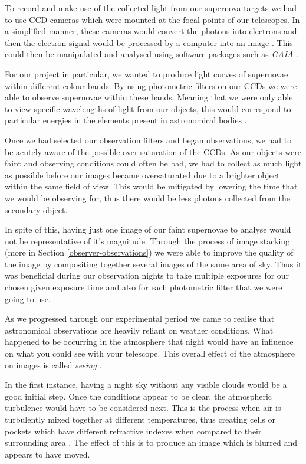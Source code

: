 \documentclass[twocolumn]{revtex4}
\begin{document}
To record and make use of the collected light from our supernova targets we had to use CCD cameras which were mounted at the focal points of our telescopes. In a simplified manner, these cameras would convert the photons into electrons and then the electron signal would be processed by a computer into an image \cite{mod_ast, tel_tech}. This could then be manipulated and analysed using software packages such as \textit{GAIA} \cite{starlink}.

For our project in particular, we wanted to produce light curves of supernovae within different colour bands. By using photometric filters on our CCDs we were able to observe supernovae within these bands. Meaning that we were only able to view specific wavelengths of light from our objects, this would correspond to particular energies in the elements present in astronomical bodies \cite{astro_filters}. 

Once we had selected our observation filters and began observations, we had to be acutely aware of the possible over-saturation of the CCDs. As our objects were faint and observing conditions could often be bad, we had to collect as much light as possible before our images became oversaturated due to a brighter object within the same field of view. This would be mitigated by lowering the time that we would be observing for, thus there would be less photons collected from the secondary object.

In spite of this, having just one image of our faint supernovae to analyse would not be representative of it's magnitude. Through the process of image stacking (more in Section \ref{observer-observations}) we were able to improve the quality of the image by compositing together several images of the same area of sky. Thus it was beneficial during our observation nights to take multiple exposures for our chosen given exposure time and also for each photometric filter that we were going to use. 

As we progressed through our experimental period we came to realise that astronomical observations are heavily reliant on weather conditions. What happened to be occurring in the atmosphere that night would have an influence on what you could see with your telescope. This overall effect of the atmosphere on images is called \textit{seeing} \cite{tel_tech}.

In the first instance, having a night sky without any visible clouds would be a good initial step. Once the conditions appear to be clear, the atmospheric turbulence would have to be considered next. This is the process when air is turbulently mixed together at different temperatures, thus creating cells or pockets which have different refractive indexes when compared to their surrounding area \cite{princ_stell_inter}. The effect of this is to produce an image which is blurred and appears to have moved.
\end{document}
